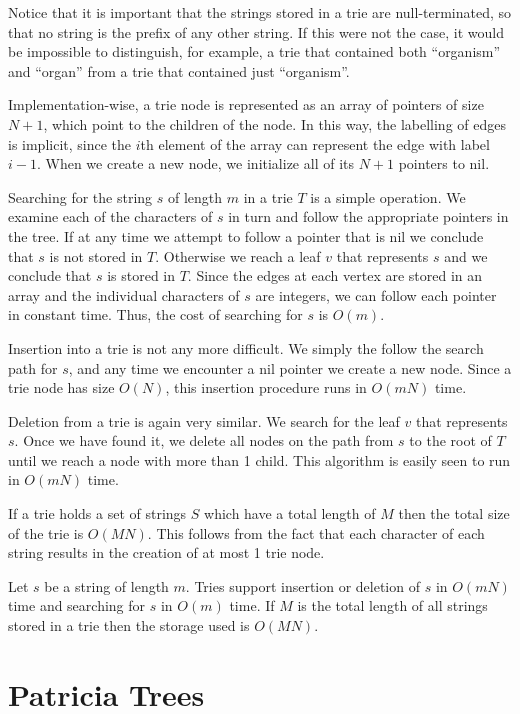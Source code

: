 Notice that it is important that the strings stored in a trie are
null-terminated, so that no string is the prefix of any other string.
If this were not the case, it would be impossible to distinguish, for
example, a trie that contained both ``organism'' and ``organ'' from a
trie that contained just ``organism''.

Implementation-wise, a trie node is represented as an array of
pointers of size $N+1$, which point to the children of the node.  In
this way, the labelling of edges is implicit, since the $i$th element
of the array can represent the edge with label $i-1$.  When we create
a new node, we initialize all of its $N+1$ pointers to nil.

Searching for the string $s$ of length $m$ in a trie $T$ is a simple
operation.  We examine each of the characters of $s$ in turn and
follow the appropriate pointers in the tree.  If at any time we
attempt to follow a pointer that is nil we conclude that $s$ is not
stored in $T$.  Otherwise we reach a leaf $v$ that represents $s$ and
we conclude that $s$ is stored in $T$.  Since the edges at each vertex
are stored in an array and the individual characters of $s$ are
integers, we can follow each pointer in constant time.  Thus, the cost
of searching for $s$ is $O(m)$.

Insertion into a trie is not any more difficult.  We simply the follow
the search path for $s$, and any time we encounter a nil pointer we
create a new node.  Since a trie node has size $O(N)$, this insertion
procedure runs in $O(mN)$ time.

Deletion from a trie is again very similar. We search for the leaf $v$
that represents $s$.  Once we have found it, we delete all nodes on
the path from $s$ to the root of $T$ until we reach a node with more
than 1 child.  This algorithm is easily seen to run in $O(mN)$ time.

If a trie holds a set of strings $S$ which have a total length of $M$
then the total size of the trie is $O(MN)$.  This follows from the
fact that each character of each string results in the creation of at
most 1 trie node.

\begin{thm}
Let $s$ be a string of length $m$.  Tries support insertion or
deletion of $s$ in $O(mN)$ time and searching for $s$ in $O(m)$ time.
If $M$ is the total length of all strings stored in a trie then the
storage used is $O(MN)$.
\end{thm}


\section{Patricia Trees}

